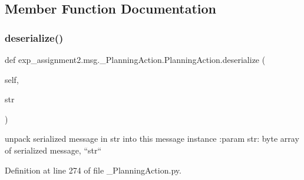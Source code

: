 \subsection{Member Function Documentation}
\mbox{\label{classexp__assignment2_1_1msg_1_1__PlanningAction_1_1PlanningAction_a67a9e7b0dda940f312ffcb35f7cfb419}} 
\subsubsection{\texorpdfstring{deserialize()}{deserialize()}}
{\footnotesize\ttfamily def exp\+\_\+assignment2.\+msg.\+\_\+\+Planning\+Action.\+Planning\+Action.\+deserialize (\begin{DoxyParamCaption}\item[{}]{self,  }\item[{}]{str }\end{DoxyParamCaption})}

\begin{DoxyVerb}unpack serialized message in str into this message instance
:param str: byte array of serialized message, ``str``
\end{DoxyVerb}
 

Definition at line 274 of file \+\_\+\+Planning\+Action.\+py.



